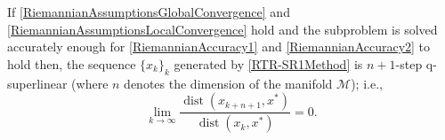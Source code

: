 \begin{theorem} \label{RiemannianLocalConvergence}
    If \cref{RiemannianAssumptionsGlobalConvergence} and \cref{RiemannianAssumptionsLocalConvergence} hold and the subproblem is solved accurately enough for \cref{RiemannianAccuracy1} and \cref{RiemannianAccuracy2} to hold then, the sequence $\{ x_k \}_k$ generated by \cref{RTR-SR1Method} is $n + 1$-step q-superlinear (where $n$ denotes the dimension of the manifold $\mathcal{M}$); i.e.,
    \begin{equation}
        \lim_{k \rightarrow \infty} \frac{\operatorname{dist}(x_{k+n+1}, x^*)}{\operatorname{dist}(x_k, x^*)} = 0.
    \end{equation}
\end{theorem}